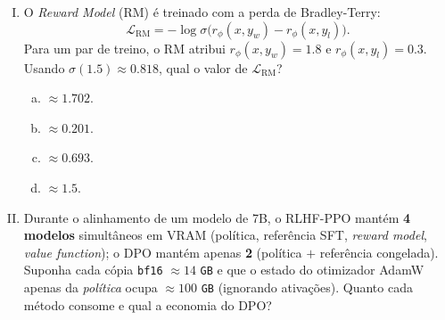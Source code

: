 \documentclass{dlproblemset}
\begin{document}
\begin{enumerate}[I)]
\begin{enumerate}[a)]
    \item \texttt{BF16} tem $8$ bits de expoente, a mesma faixa dinâmica do
          \texttt{fp32}, enquanto \texttt{fp16} tem $5$ bits de expoente e
          satura próximo de $65\,504$.
    \item \texttt{BF16} tem $16$ bits de mantissa, oferecendo mais precisão
          que os $10$ bits do \texttt{fp16}, eliminando os erros de
          arredondamento que causavam os \texttt{NaN}.
    \item \texttt{BF16} é \textit{lossless} para pesos de redes neurais, ao
          contrário do \texttt{fp16}, que sempre introduz erros de
          quantização.
    \item \texttt{BF16} usa o dobro de bits do \texttt{fp16} ($32$ vs.\ $16$),
          o que explica o ganho de faixa dinâmica e de estabilidade numérica.
\end{enumerate}

\item O \textit{Reward Model} (RM) é treinado com a perda de Bradley-Terry:
      \[
        \mathcal{L}_{\text{RM}} = -\log\sigma\!\big(r_\phi(x,y_w) - r_\phi(x,y_l)\big).
      \]
      Para um par de treino, o RM atribui $r_\phi(x,y_w) = 1.8$ e
      $r_\phi(x,y_l) = 0.3$. Usando $\sigma(1.5) \approx 0.818$,
      qual o valor de $\mathcal{L}_{\text{RM}}$?

\begin{enumerate}[a)]
    \item $\approx 1.702$.
    \item $\approx 0.201$.
    \item $\approx 0.693$.
    \item $\approx 1.5$.
\end{enumerate}

\item Durante o alinhamento de um modelo de 7B, o RLHF-PPO mantém
      \textbf{4 modelos} simultâneos em VRAM (política, referência SFT,
      \textit{reward model}, \textit{value function}); o DPO mantém apenas
      \textbf{2} (política $+$ referência congelada). Suponha cada cópia
      \texttt{bf16} $\approx 14$ \texttt{GB} e que o estado do otimizador
      AdamW apenas da \emph{política} ocupa $\approx 100$ \texttt{GB}
      (ignorando ativações). Quanto cada método consome e qual a economia
      do DPO?


\end{enumerate}
\end{document}
